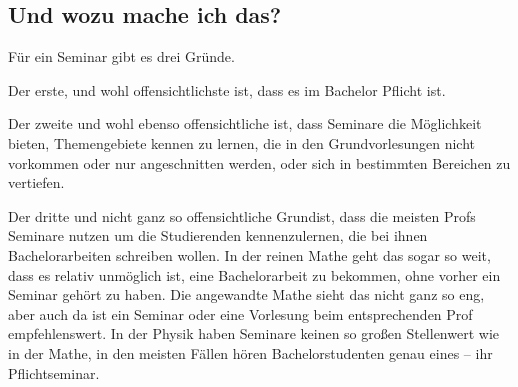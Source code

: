\subsection{Und wozu mache ich das?}
Für ein Seminar gibt es drei Gründe.

Der erste, und wohl offensichtlichste ist, dass es im Bachelor Pflicht ist.

Der zweite und wohl ebenso offensichtliche ist, dass Seminare die Möglichkeit
bieten, Themengebiete kennen zu lernen, die in den Grundvorlesungen nicht
vorkommen oder nur angeschnitten werden, oder sich in bestimmten Bereichen zu
vertiefen.

Der dritte und nicht ganz so offensichtliche Grundist, dass die meisten Profs
Seminare nutzen um die Studierenden kennenzulernen, die bei ihnen
Bachelorarbeiten schreiben wollen.  In der reinen Mathe geht das sogar so weit,
dass es relativ unmöglich ist, eine Bachelorarbeit zu bekommen, ohne vorher ein
Seminar gehört zu haben.  Die angewandte Mathe sieht das nicht ganz so eng,
aber auch da ist ein Seminar oder eine Vorlesung beim entsprechenden Prof
empfehlenswert.  In der Physik haben Seminare keinen so großen Stellenwert wie
in der Mathe, in den meisten Fällen hören Bachelorstudenten genau eines -- ihr
Pflichtseminar.
